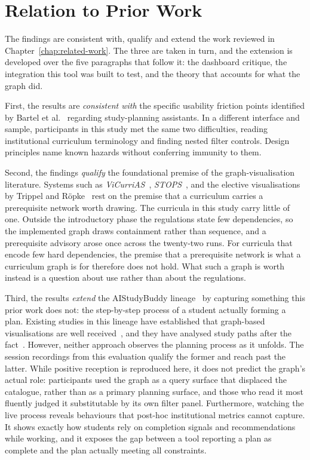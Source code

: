 \section{Relation to Prior Work}
\label{sec:disc-related}

The findings are consistent with, qualify and extend the work reviewed in Chapter~\ref{chap:related-work}. The three are taken in turn, and the extension is developed over the five paragraphs that follow it: the dashboard critique, the integration this tool was built to test, and the theory that accounts for what the graph did.

First, the results are \emph{consistent with} the specific usability friction points identified by Bartel et al.~\cite{bartel_design_2024} regarding study-planning assistants. In a different interface and sample, participants in this study met the same two difficulties, reading institutional curriculum terminology and finding nested filter controls. Design principles name known hazards without conferring immunity to them.

Second, the findings \emph{qualify} the foundational premise of the graph-visualisation literature. Systems such as \emph{ViCurriAS}~\cite{zucker_vicurrias_2009}, \emph{STOPS}~\cite{auvinen_stops_2014}, and the elective visualisations by Trippel and Röpke~\cite{trippel_developing_2025} rest on the premise that a curriculum carries a prerequisite network worth drawing. The curricula in this study carry little of one. Outside the introductory phase the regulations state few dependencies, so the implemented graph draws containment rather than sequence, and a prerequisite advisory arose once across the twenty-two runs. For curricula that encode few hard dependencies, the premise that a prerequisite network is what a curriculum graph is for therefore does not hold. What such a graph is worth instead is a question about use rather than about the regulations.

Third, the results \emph{extend} the AIStudyBuddy lineage~\cite{roepke_study_2024, judel_supporting_2023, trippel_developing_2025} by capturing something this prior work does not: the step-by-step process of a student actually forming a plan. Existing studies in this lineage have established that graph-based visualisations are well received~\cite{trippel_developing_2025}, and they have analysed study paths after the fact~\cite{roepke_study_2024}. However, neither approach observes the planning process as it unfolds. The session recordings from this evaluation qualify the former and reach past the latter. While positive reception is reproduced here, it does not predict the graph's actual role: participants used the graph as a query surface that displaced the catalogue, rather than as a primary planning surface, and those who read it most fluently judged it substitutable by its own filter panel. Furthermore, watching the live process reveals behaviours that post-hoc institutional metrics cannot capture. It shows exactly how students rely on completion signals and recommendations while working, and it exposes the gap between a tool reporting a plan as complete and the plan actually meeting all constraints.

